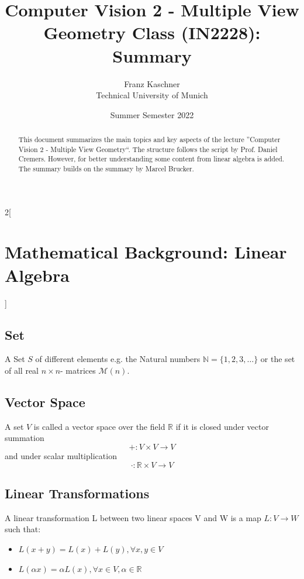 \documentclass[oneside,fontsize=11pt,paper=a4]{scrartcl}
\title{Computer Vision 2 - Multiple View Geometry Class (IN2228): Summary}
\author{Franz Kaschner \\ Technical University of Munich \\}
\date{Summer Semester 2022}
\begin{document}
\maketitle

\begin{abstract}
\noindent This document summarizes the main topics and key aspects of the lecture ''Computer Vision 2 - Multiple View Geometry``. The structure follows the script by Prof. Daniel Cremers. However, for better understanding some content from linear algebra is added. The summary builds on the summary by Marcel Brucker.
\end{abstract}

\begin{multicols}{2}[\section{Mathematical Background: Linear Algebra}]
\subsection{Set}
A Set $S$ of different elements e.g. the Natural numbers $\mathbb{N} = \{1, 2, 3, \dots\}$ or the set of all real $n \times n$- matrices $\mathcal{M}(n)$.

\subsection{Vector Space}
A set $V$ is called a vector space over the field $\mathbb{R}$ if it is closed under vector summation
\begin{equation*}
	+: V \times V \rightarrow V
\end{equation*}
and under scalar multiplication
\begin{equation*}
	\cdot: \mathbb{R} \times V \rightarrow V
\end{equation*}

\subsection{Linear Transformations}
A linear transformation L between two linear spaces V and W is a map $L: V \rightarrow W$ such that:
\begin{itemize}
    \item $L(x+y)=L(x)+L(y), \forall x,y \in V$
    \item $L(\alpha x) = \alpha L(x), \forall x \in V, \alpha \in \mathbb{R} $
\end{itemize}


\end{multicols}
\end{document}
